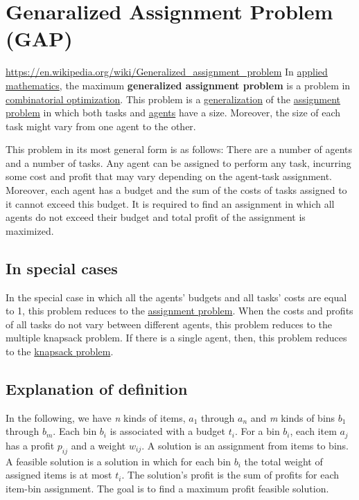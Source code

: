 {\section{Genaralized Assignment Problem (GAP)}
\url{https://en.wikipedia.org/wiki/Generalized_assignment_problem}
In \href{applied_mathematics}{applied mathematics}, the maximum
\textbf{generalized assignment problem} is a problem in
\href{combinatorial_optimization}{combinatorial optimization}. This
problem is a \url{generalization} of the
\href{assignment_problem}{assignment problem} in which both tasks and
\href{Agent-based_model}{agents} have a size. Moreover, the size of each
task might vary from one agent to the other.

This problem in its most general form is as follows: There are a number
of agents and a number of tasks. Any agent can be assigned to perform
any task, incurring some cost and profit that may vary depending on the
agent-task assignment. Moreover, each agent has a budget and the sum of
the costs of tasks assigned to it cannot exceed this budget. It is
required to find an assignment in which all agents do not exceed their
budget and total profit of the assignment is maximized.

\hypertarget{in-special-cases}{%
\subsection{In special cases}\label{in-special-cases}}

In the special case in which all the agents' budgets and all tasks'
costs are equal to 1, this problem reduces to the
\href{assignment_problem}{assignment problem}. When the costs and
profits of all tasks do not vary between different agents, this problem
reduces to the multiple knapsack problem. If there is a single agent,
then, this problem reduces to the \href{knapsack_problem}{knapsack
problem}.

\hypertarget{explanation-of-definition}{%
\subsection{Explanation of definition}\label{explanation-of-definition}}

In the following, we have \emph{n} kinds of items, \(a_1\) through
\(a_n\) and \emph{m} kinds of bins \(b_1\) through \(b_m\). Each bin
\(b_i\) is associated with a budget \(t_i\). For a bin \(b_i\), each
item \(a_j\) has a profit \(p_{ij}\) and a weight \(w_{ij}\). A solution
is an assignment from items to bins. A feasible solution is a solution
in which for each bin \(b_i\) the total weight of assigned items is at
most \(t_i\). The solution's profit is the sum of profits for each
item-bin assignment. The goal is to find a maximum profit feasible
solution.

}
